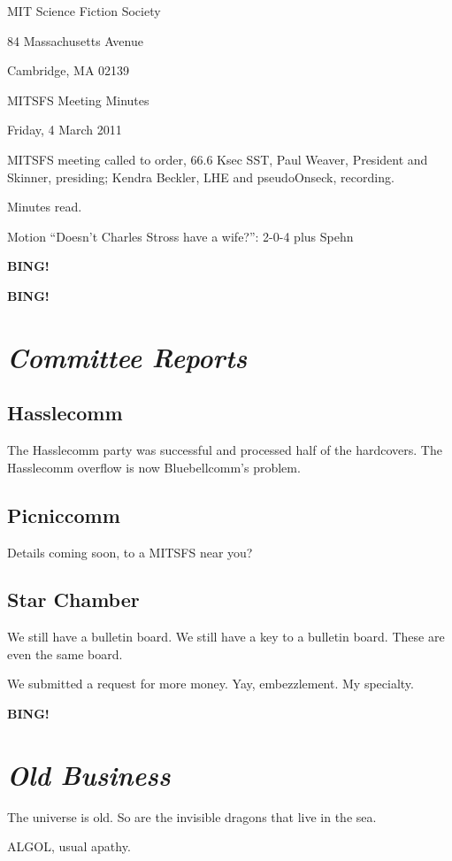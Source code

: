 \documentclass[10pt]{article}
\newcommand{\bing}{{\bf BING!} }
\newcommand{\goto}[1]{\bing \vskip 12pt \section*{{\em{#1}}}}
\newcommand{\ps}{ plus Spehn\xspace}
\newcommand{\skinner}{Paul Weaver, President and Skinner}
\newcommand{\onseck}{Kendra Beckler, LHE and pseudoOnseck}
\newcommand{\meetingdate}{Friday, 4 March 2011}
\begin{document}
\begin{center}

MIT Science Fiction Society

84 Massachusetts Avenue

Cambridge, MA 02139

\vspace{12pt}

MITSFS Meeting Minutes

\meetingdate

\end{center}

\vspace{18pt}

\setlength{\parskip}{6pt}

\noindent
MITSFS meeting called to order, 66.6 Ksec SST,
\skinner, presiding; \onseck, recording.

Minutes read.

Motion ``Doesn't Charles Stross have a wife?'': 2-0-4 \ps

\bing

\goto{Committee Reports}

\subsection*{Hasslecomm}

The Hasslecomm party was successful and processed half of the hardcovers.  The Hasslecomm overflow is now Bluebellcomm's problem.

\subsection*{Picniccomm}

Details coming soon, to a MITSFS near you?

\subsection*{Star Chamber}

We still have a bulletin board.  We still have a key to a bulletin board.  These are even the same board.

We submitted a request for more money.  Yay, embezzlement.  My specialty.

\goto{Old Business}

The universe is old.  So are the invisible dragons that live in the sea.

ALGOL, usual apathy.
\end{document}
